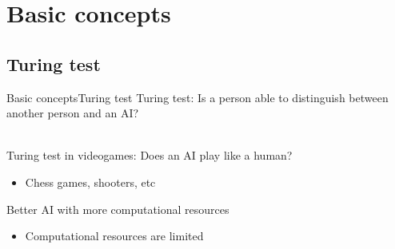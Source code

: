 \documentclass[10pt,compress]{beamer} %
\begin{document}
\section{Basic concepts}
\subsection{Turing test}
\begin{frame}{Basic concepts}{Turing test}
	   Turing test: Is a person able to distinguish between another person and an AI?\\
		\\
		\raggedright Turing test in videogames: Does an AI play like a human?
 	 	\begin{itemize}
		\item Chess games, shooters, etc
		\end{itemize}
		Better AI with more computational resources
 	 	\begin{itemize}
		\item Computational resources are limited
		\end{itemize}
\end{frame}
\end{document}
